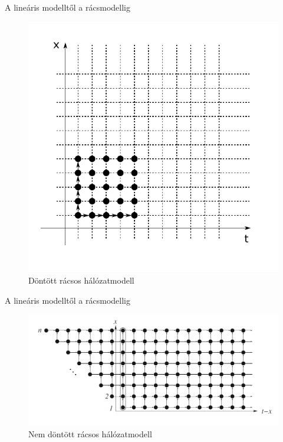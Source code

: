\documentclass[10pt]{beamer}
\begin{document}
\begin{frame}{A lineáris modelltől a rácsmodellig}
	\begin{figure}
		\centering \includegraphics[width=0.8\columnwidth]{Image/grid_network}
		\caption{\label{fig:grid_network}Döntött rácsos hálózatmodell \cite{even2016}}
	\end{figure}
\end{frame}

\begin{frame}{A lineáris modelltől a rácsmodellig}
	\begin{figure}
		\centering \includegraphics[width=1\columnwidth]{Image/grid_network_untilted}
		\caption{\label{fig:grid_network_untilted}Nem döntött rácsos hálózatmodell \cite{even2016}}
	\end{figure}
\end{frame}
\end{document}
